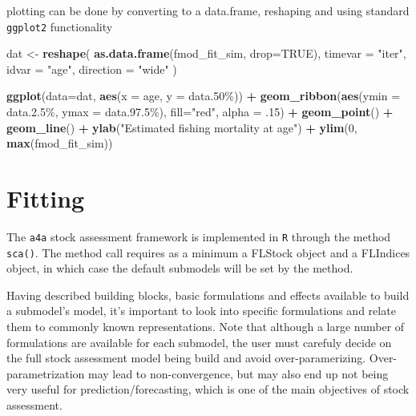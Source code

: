 \documentclass[
]{book}
\newenvironment{Shaded}{\begin{snugshade}}{\end{snugshade}}
\newcommand{\AttributeTok}[1]{\textcolor[rgb]{0.13,0.29,0.53}{#1}}
\newcommand{\ConstantTok}[1]{\textcolor[rgb]{0.56,0.35,0.01}{#1}}
\newcommand{\DecValTok}[1]{\textcolor[rgb]{0.00,0.00,0.81}{#1}}
\newcommand{\FunctionTok}[1]{\textcolor[rgb]{0.13,0.29,0.53}{\textbf{#1}}}
\newcommand{\NormalTok}[1]{#1}
\newcommand{\OtherTok}[1]{\textcolor[rgb]{0.56,0.35,0.01}{#1}}
\newcommand{\SpecialCharTok}[1]{\textcolor[rgb]{0.81,0.36,0.00}{\textbf{#1}}}
\newcommand{\StringTok}[1]{\textcolor[rgb]{0.31,0.60,0.02}{#1}}
\begin{document}
plotting can be done by converting to a data.frame, reshaping and using standard \texttt{ggplot2} functionality

\begin{Shaded}
\begin{Highlighting}[]
\NormalTok{ dat }\OtherTok{\textless{}{-}} 
   \FunctionTok{reshape}\NormalTok{(}
     \FunctionTok{as.data.frame}\NormalTok{(fmod\_fit\_sim, }\AttributeTok{drop=}\ConstantTok{TRUE}\NormalTok{), }
     \AttributeTok{timevar =} \StringTok{"iter"}\NormalTok{, }\AttributeTok{idvar =} \StringTok{"age"}\NormalTok{, }\AttributeTok{direction =} \StringTok{"wide"}  
\NormalTok{   )}

 \FunctionTok{ggplot}\NormalTok{(}\AttributeTok{data=}\NormalTok{dat, }\FunctionTok{aes}\NormalTok{(}\AttributeTok{x =}\NormalTok{ age, }\AttributeTok{y =} \StringTok{\textasciigrave{}}\AttributeTok{data.50\%}\StringTok{\textasciigrave{}}\NormalTok{)) }\SpecialCharTok{+}
   \FunctionTok{geom\_ribbon}\NormalTok{(}\FunctionTok{aes}\NormalTok{(}\AttributeTok{ymin =} \StringTok{\textasciigrave{}}\AttributeTok{data.2.5\%}\StringTok{\textasciigrave{}}\NormalTok{, }\AttributeTok{ymax =} \StringTok{\textasciigrave{}}\AttributeTok{data.97.5\%}\StringTok{\textasciigrave{}}\NormalTok{), }
               \AttributeTok{fill=}\StringTok{"red"}\NormalTok{, }\AttributeTok{alpha =}\NormalTok{ .}\DecValTok{15}\NormalTok{) }\SpecialCharTok{+}
   \FunctionTok{geom\_point}\NormalTok{() }\SpecialCharTok{+} \FunctionTok{geom\_line}\NormalTok{() }\SpecialCharTok{+} 
   \FunctionTok{ylab}\NormalTok{(}\StringTok{"Estimated fishing mortality at age"}\NormalTok{) }\SpecialCharTok{+}
   \FunctionTok{ylim}\NormalTok{(}\DecValTok{0}\NormalTok{, }\FunctionTok{max}\NormalTok{(fmod\_fit\_sim))}
\end{Highlighting}
\end{Shaded}

\hypertarget{fitting}{%
\chapter{Fitting}\label{fitting}}

The \texttt{a4a} stock assessment framework is implemented in \texttt{R} through the method \texttt{sca()}. The method call requires as a minimum a FLStock object and a FLIndices object, in which case the default submodels will be set by the method.

Having described building blocks, basic formulations and effects available to build a submodel's model, it's important to look into specific formulations and relate them to commonly known representations. Note that although a large number of formulations are available for each submodel, the user must carefuly decide on the full stock assessment model being build and avoid over-paramerizing. Over-parametrization may lead to non-convergence, but may also end up not being very useful for prediction/forecasting, which is one of the main objectives of stock assessment.
\end{document}
